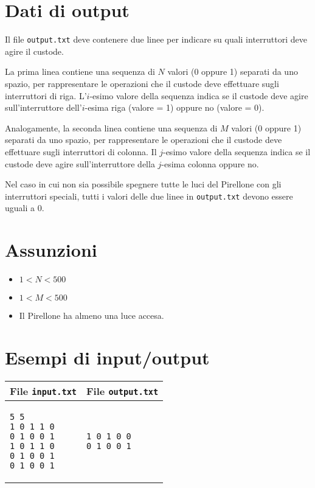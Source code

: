 \documentclass[a4paper,11pt]{article}
\begin{document}
\section*{Dati di output}
  
Il file \texttt{output.txt} deve contenere due linee per indicare
su quali interruttori deve agire il custode.

La prima linea contiene una sequenza di $N$ valori (0 oppure
1) separati da uno spazio, per rappresentare le operazioni che il
custode deve effettuare sugli interruttori di riga.
L'$i$-esimo valore della sequenza indica se il custode deve
agire sull'interruttore dell'$i$-esima riga (valore = 1)
oppure no (valore = 0).

Analogamente, la seconda linea contiene una sequenza di $M$
valori (0 oppure 1) separati da uno spazio, per rappresentare le
operazioni che il custode deve effettuare sugli interruttori di
colonna.  Il $j$-esimo valore della sequenza indica se il
custode deve agire sull'interruttore della $j$-esima colonna
oppure no.

Nel caso in cui non sia possibile spegnere tutte le luci del Pirellone
con gli interruttori speciali, tutti i valori delle due linee in
\texttt{output.txt} devono essere uguali a 0.

  \section*{Assunzioni}
  \begin{itemize}
  
    \item $ 1 < N < 500$
    \item $ 1 < M < 500$
    \item  Il Pirellone ha almeno una luce accesa.
  \end{itemize}

\section*{Esempi di input/output}

  
    \noindent
    \begin{tabular}{p{11cm}|p{5cm}}
    \toprule
    \textbf{File \texttt{input.txt}}
    & \textbf{File \texttt{output.txt}}
    \\
    \midrule
    \scriptsize
    \begin{verbatim}
5 5
1 0 1 1 0
0 1 0 0 1
1 0 1 1 0
0 1 0 0 1
0 1 0 0 1
\end{verbatim}
    &
    \scriptsize
    \begin{verbatim}
1 0 1 0 0
0 1 0 0 1
\end{verbatim}
    \\
    \bottomrule
    \end{tabular}
  
\end{document}
